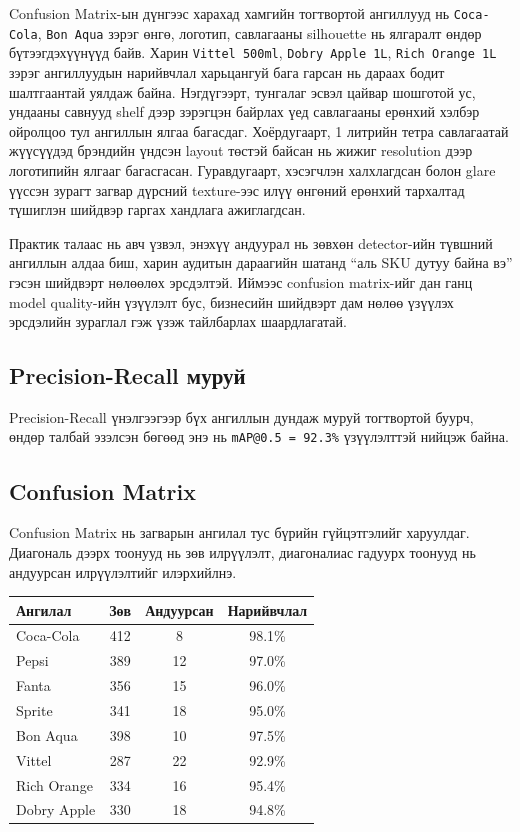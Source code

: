 Confusion Matrix-ын дүнгээс харахад хамгийн тогтвортой ангиллууд нь \texttt{Coca-Cola}, \texttt{Bon Aqua} зэрэг өнгө, логотип, савлагааны silhouette нь ялгаралт өндөр бүтээгдэхүүнүүд байв. Харин \texttt{Vittel 500ml}, \texttt{Dobry Apple 1L}, \texttt{Rich Orange 1L} зэрэг ангиллуудын нарийвчлал харьцангуй бага гарсан нь дараах бодит шалтгаантай уялдаж байна. Нэгдүгээрт, тунгалаг эсвэл цайвар шошготой ус, ундааны савнууд shelf дээр зэрэгцэн байрлах үед савлагааны ерөнхий хэлбэр ойролцоо тул ангиллын ялгаа багасдаг. Хоёрдугаарт, 1 литрийн тетра савлагаатай жүүсүүдэд брэндийн үндсэн layout төстэй байсан нь жижиг resolution дээр логотипийн ялгааг багасгасан. Гуравдугаарт, хэсэгчлэн халхлагдсан болон glare үүссэн зурагт загвар дүрсний texture-ээс илүү өнгөний ерөнхий тархалтад түшиглэн шийдвэр гаргах хандлага ажиглагдсан.

Практик талаас нь авч үзвэл, энэхүү андуурал нь зөвхөн detector-ийн түвшний ангиллын алдаа биш, харин аудитын дараагийн шатанд ``аль SKU дутуу байна вэ'' гэсэн шийдвэрт нөлөөлөх эрсдэлтэй. Иймээс confusion matrix-ийг дан ганц model quality-ийн үзүүлэлт бус, бизнесийн шийдвэрт дам нөлөө үзүүлэх эрсдэлийн зураглал гэж үзэж тайлбарлах шаардлагатай.

\subsection{Precision-Recall муруй}

Precision-Recall үнэлгээгээр бүх ангиллын дундаж муруй тогтвортой буурч, өндөр талбай эзэлсэн бөгөөд энэ нь \texttt{mAP@0.5 = 92.3\%} үзүүлэлттэй нийцэж байна.

\subsection{Confusion Matrix}

Confusion Matrix нь загварын ангилал тус бүрийн гүйцэтгэлийг харуулдаг. Диагональ дээрх тоонууд нь зөв илрүүлэлт, диагоналиас гадуурх тоонууд нь андуурсан илрүүлэлтийг илэрхийлнэ.

\begin{table}[H]
\centering
\caption{Confusion Matrix-ын товч үзүүлэлт}
\label{tab:confusion_summary}
\begin{longtable}{|l|c|c|c|}
\hline
\textbf{Ангилал} & \textbf{Зөв} & \textbf{Андуурсан} & \textbf{Нарийвчлал} \\
\hline
Coca-Cola & 412 & 8 & 98.1\% \\
\hline
Pepsi & 389 & 12 & 97.0\% \\
\hline
Fanta & 356 & 15 & 96.0\% \\
\hline
Sprite & 341 & 18 & 95.0\% \\
\hline
Bon Aqua & 398 & 10 & 97.5\% \\
\hline
Vittel & 287 & 22 & 92.9\% \\
\hline
Rich Orange & 334 & 16 & 95.4\% \\
\hline
Dobry Apple & 330 & 18 & 94.8\% \\
\hline
\end{longtable}
\end{table}


